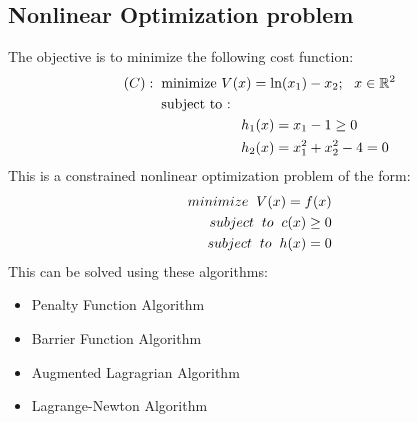 \clearpage
\subsection{Nonlinear Optimization problem}
The objective is to minimize the following cost function:
\begin{align}
(C) : \hspace{2mm}
& \mbox{minimize} \ V(x) = \mbox{ln}(x_1)- x_2 ; \ \  x \in \mathbb{R}^2 \nonumber \\
& \mbox{subject to : } \nonumber \\
& \hspace{2cm} h_1(x)= x_1 - 1  \geq 0 \nonumber \\
& \hspace{2cm} h_2(x)= x_1^2 + x_2^2 -4 = 0 \nonumber
\end{align}
This is a constrained nonlinear optimization problem of the form:
\begin{align}
    minimize \hspace{2mm} V(x) = f(x) \\
    subject\hspace{2mm} to\hspace{2mm} c(x) \geq 0 \\
    subject\hspace{2mm} to \hspace{2mm}h(x) = 0 \\
\end{align}
This can be solved using these algorithms: 
\begin{itemize}
    \item Penalty Function Algorithm
    \item Barrier Function Algorithm
    \item Augmented Lagragrian Algorithm
    \item Lagrange-Newton Algorithm
\end{itemize}
